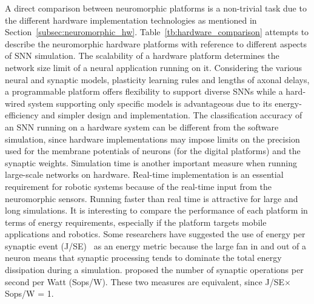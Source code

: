A direct comparison between neuromorphic platforms is a non-trivial task due to the different hardware implementation technologies as mentioned in Section~\ref{subsec:neuromorphic_hw}.
Table~\ref{tb:hardware_comparison} attempts to describe the neuromorphic hardware platforms with reference to different aspects of SNN simulation.
The scalability of a hardware platform determines the network size limit of a neural application running on it.
Considering the various neural and synaptic models, plasticity learning rules and lengths of axonal delays, a programmable platform offers flexibility to support diverse SNNs while a hard-wired system supporting only specific models is advantageous due to its energy-efficiency and simpler design and implementation.
The classification accuracy of an SNN running on a hardware system can be different from the software simulation, since hardware implementations may impose limits on the precision used for the membrane potentials of neurons (for the digital platforms) and the synaptic weights.
Simulation time is another important measure when running large-scale networks on hardware.
Real-time implementation is an essential requirement for robotic systems because of the real-time input from the neuromorphic sensors.
Running faster than real time is attractive for large and long simulations.
It is interesting to compare the performance of each platform in terms of energy requirements, especially if the platform targets mobile applications and robotics.
Some researchers have suggested the use of energy per synaptic event (J/SE)~\citep{sharp2012power,stromatias2013power} as an energy metric because the large fan in and out of a neuron means that synaptic processing tends to dominate the total energy dissipation during a simulation.
\DIFdelbegin {}\DIFdelend \DIFaddbegin {}\DIFaddend proposed the number of synaptic operations per second per Watt (Sops/W).
These two measures are equivalent, since J/SE$\times$Sops/W = 1.

